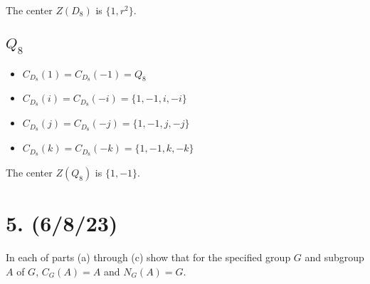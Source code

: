 \documentclass{article}
\begin{document}
The center $Z(D_8)$ is $\{ 1, r^2 \}$.

\subsection*{$Q_8$}

\begin{itemize}
    \item $C_{D_8}(1) = C_{D_8}(-1) = Q_8$
    \item $C_{D_8}(i) = C_{D_8}(-i) = \{ 1, -1, i, -i \}$
    \item $C_{D_8}(j) = C_{D_8}(-j) = \{ 1, -1, j, -j \}$
    \item $C_{D_8}(k) = C_{D_8}(-k) = \{ 1, -1, k, -k \}$
\end{itemize}

The center $Z(Q_8)$ is $\{ 1, -1 \}$.

\section*{5. (6/8/23)}

In each of parts (a) through (c) show that for the specified group $G$ and subgroup $A$ of $G$, $C_G(A) = A$ and $N_G(A) = G$.
\end{document}
